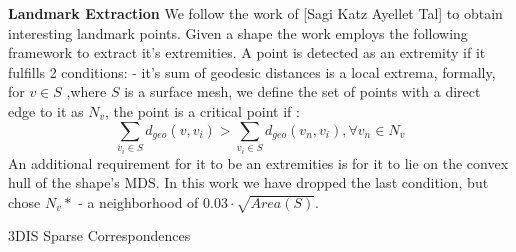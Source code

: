 \documentclass[10pt,twocolumn,letterpaper]{article}
\begin{document}
\textbf{Landmark Extraction}
We follow the work of [Sagi Katz Ayellet Tal] to obtain interesting landmark points. Given a shape the work employs the following framework to extract it's extremities. A point is detected as an extremity if it fulfills 2 conditions: - it's sum of geodesic distances is a local extrema, formally, for $v\in S$ ,where $S$ is a surface mesh, we define the set of points with a direct edge to it as $N_v$, the point is a critical point if :
\begin{equation}
\sum_{v_i\in S}d_{geo}(v,v_i)>\sum_{v_i\in S}d_{geo}(v_n,v_i), \forall v_n\in N_v
\end{equation}
An additional requirement for it to be an extremities is for it to lie on the convex hull of the shape's MDS. In this work we have dropped the last condition, but chose $N_v*$ - a neighborhood of $0.03\cdot \sqrt{Area(S)}$.


\begin{algorithm}[h]
	\caption{3DIS Sparse Correspondences}
	\begin{algorithmic}
		 
		\EndFor
		\EndProcedure
	\end{algorithmic}
\end{algorithm}
\end{document}
